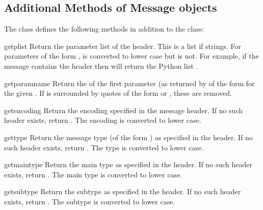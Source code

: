 \subsection{Additional Methods of Message objects}

The  class defines the following methods in
addition to the  class:

\renewcommand{\indexsubitem}{(mimetool.Message method)}

\begin{funcdesc}{getplist}{}
Return the parameter list of the  header.  This is
a list if strings.  For parameters of the form
,  is converted to lower case but
 is not.  For example, if the message contains the header
 then
 will return the Python list \code{['spam=1',
'spam=2', 'Spam']}.
\end{funcdesc}

\begin{funcdesc}{getparam}{name}
Return the  of the first parameter (as returned by
 of the form  for the
given .  If  is surrounded by quotes of the form
 or , these are removed.
\end{funcdesc}

\begin{funcdesc}{getencoding}{}
Return the encoding specified in the 
message header.  If no such header exists, return .  The
encoding is converted to lower case.
\end{funcdesc}

\begin{funcdesc}{gettype}{}
Return the message type (of the form )
as specified in the  header.  If no such header
exists, return .  The type is converted to lower
case.
\end{funcdesc}

\begin{funcdesc}{getmaintype}{}
Return the main type as specified in the  header.
If no such header exists, return .  The main type is
converted to lower case.
\end{funcdesc}

\begin{funcdesc}{getsubtype}{}
Return the subtype as specified in the  header.  If
no such header exists, return .  The subtype is
converted to lower case.
\end{funcdesc}
